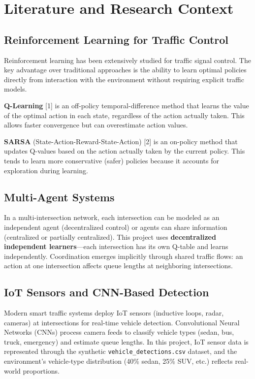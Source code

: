 \documentclass[12pt, a4paper]{article}
\begin{document}
\section{Literature and Research Context}

\subsection{Reinforcement Learning for Traffic Control}

Reinforcement learning has been extensively studied for traffic signal control. The key advantage over traditional approaches is the ability to learn optimal policies directly from interaction with the environment without requiring explicit traffic models.

\textbf{Q-Learning} [1] is an off-policy temporal-difference method that learns the value of the optimal action in each state, regardless of the action actually taken. This allows faster convergence but can overestimate action values.

\textbf{SARSA} (State-Action-Reward-State-Action) [2] is an on-policy method that updates Q-values based on the action actually taken by the current policy. This tends to learn more conservative (safer) policies because it accounts for exploration during learning.

\subsection{Multi-Agent Systems}

In a multi-intersection network, each intersection can be modeled as an independent agent (decentralized control) or agents can share information (centralized or partially centralized). This project uses \textbf{decentralized independent learners}---each intersection has its own Q-table and learns independently. Coordination emerges implicitly through shared traffic flows: an action at one intersection affects queue lengths at neighboring intersections.

\subsection{IoT Sensors and CNN-Based Detection}

Modern smart traffic systems deploy IoT sensors (inductive loops, radar, cameras) at intersections for real-time vehicle detection. Convolutional Neural Networks (CNNs) process camera feeds to classify vehicle types (sedan, bus, truck, emergency) and estimate queue lengths. In this project, IoT sensor data is represented through the synthetic \texttt{vehicle\_detections.csv} dataset, and the environment's vehicle-type distribution (40\% sedan, 25\% SUV, etc.) reflects real-world proportions.
\end{document}
